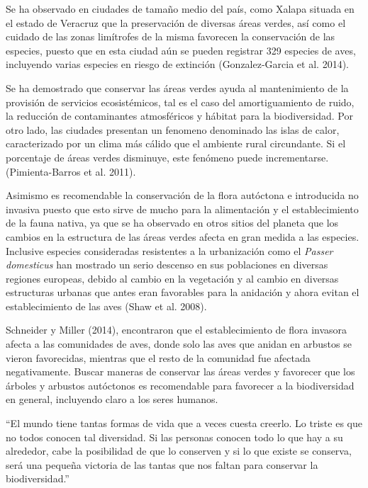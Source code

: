 \documentclass[letterpaper,12pt]{article}
\begin{document}
Se ha observado en ciudades de tamaño medio del país, como Xalapa situada en el estado de Veracruz que la preservación de diversas áreas verdes, así como el cuidado de las zonas limítrofes de la misma favorecen la conservación de las especies, puesto que en esta ciudad aún se pueden registrar 329 especies de aves, incluyendo varias especies en riesgo de extinción (Gonzalez-Garcia et al. 2014).

Se ha demostrado que conservar las áreas verdes ayuda al mantenimiento de la provisión de servicios ecosistémicos, tal es el caso del amortiguamiento de ruido, la reducción de contaminantes atmosféricos y hábitat para la biodiversidad.
Por otro lado, las ciudades presentan un fenomeno denominado las islas de calor, caracterizado por un clima más cálido que el ambiente rural circundante. Si el porcentaje de áreas verdes disminuye, este fenómeno puede incrementarse. (Pimienta-Barros et al.  2011).

Asimismo es recomendable la conservación de la flora autóctona e introducida no invasiva  puesto que esto sirve de mucho para la alimentación y el establecimiento de la fauna nativa, ya que se ha observado en otros sitios del planeta que  los cambios en la estructura de las áreas verdes afecta en gran medida a las especies. Inclusive especies consideradas resistentes a la urbanización como el \textit{Passer domesticus} 
han mostrado un serio descenso en sus poblaciones en diversas regiones europeas, debido al cambio en la vegetación y al cambio en diversas  estructuras urbanas  que antes eran favorables para la anidación  y ahora evitan el establecimiento de las aves (Shaw et al. 2008).

Schneider y Miller (2014), encontraron que el establecimiento de flora invasora afecta a las comunidades de aves, donde solo
las aves que anidan en arbustos se vieron favorecidas, mientras que el resto de la comunidad fue afectada negativamente.
Buscar maneras de conservar las áreas verdes y favorecer que los árboles y arbustos autóctonos es recomendable
para favorecer a la biodiversidad en general, incluyendo claro a los seres humanos.
\newpage
{\linespread{1}
\epigraph{``El mundo tiene tantas formas de vida que a veces cuesta creerlo. Lo triste es que no todos conocen tal diversidad. Si las personas conocen todo lo que hay a su alrededor, cabe la posibilidad de que lo conserven y si lo que existe se conserva, será una pequeña victoria de las tantas que nos faltan para conservar la biodiversidad.''}{}\\}
\end{document}
